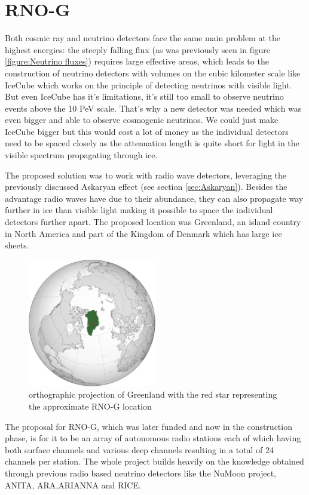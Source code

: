 \section{RNO-G}
Both cosmic ray and neutrino detectors face the same main problem at the
highest energies: the steeply falling flux (as was previously seen in figure
\ref{figure:Neutrino fluxes}) requires large effective areas, which leads to
the construction of neutrino detectors with volumes on the cubic kilometer
scale like IceCube\cite{IceCubeTechnical} which works on the principle of
detecting neutrinos with visible light.  But even IceCube has it's limitations,
it's still too small to observe neutrino events above the 10 PeV
scale\cite{IceCubeGen2}. That's why a new detector was needed which was even
bigger and able to observe cosmogenic neutrinos.  We could just make IceCube
bigger but this would cost a lot of money as the individual detectors need to
be spaced closely as the attenuation length is quite short for light in the
visible spectrum propagating through ice.  

The proposed solution was to work with radio wave detectors, leveraging the
previously discussed Askaryan effect (see section \ref{sec:Askaryan}).  Besides
the advantage radio waves have due to their abundance, they can also propagate
way further in ice than visible light making it possible to space the
individual detectors further apart. The proposed location was Greenland, an
island country in North America and part of the Kingdom of Denmark which has
large ice sheets.
\begin{figure}
  \centering
  \includegraphics[width=0.5\textwidth]{figures/GreenlandOP.pdf}
  \caption{orthographic projection of Greenland with the red star representing the approximate RNO-G location}
  \label{fig:GreenlandOP}
\end{figure}
The proposal for RNO-G, which was later funded and now in the construction
phase, is for it to be an array of autonomous radio stations each of which having both
surface channels and various deep channels resulting in a total of 24 channels
per station. The whole project builds heavily on the knowledge obtained through
previous radio based neutrino detectors like the NuMoon\cite{numoon} project,
ANITA\cite{ANITA}, ARA\cite{ARA},ARIANNA\cite{Barwick_2015} and RICE\cite{RICE}.
